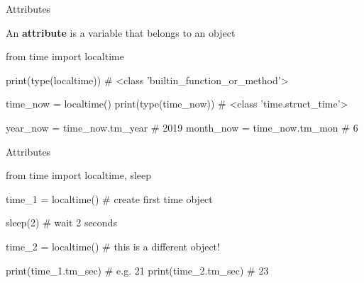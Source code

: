 \begin{frame}[fragile]{Attributes}

    \begin{block}{}
        An \textbf{attribute} is a variable that belongs to an object
    \end{block}

    \begin{pythoncode}
    from time import localtime

    print(type(localtime))
    # <class 'builtin_function_or_method'>

    time_now = localtime()
    print(type(time_now))
    # <class 'time.struct_time'>

    year_now = time_now.tm_year  # 2019
    month_now = time_now.tm_mon  # 6
    \end{pythoncode}


\end{frame}

\begin{frame}[fragile]{Attributes}

    \begin{pythoncode}
from time import localtime, sleep

time_1 = localtime()    # create first time object

sleep(2)                # wait 2 seconds

time_2 = localtime()    # this is a different object!

print(time_1.tm_sec)    # e.g. 21
print(time_2.tm_sec)    # 23
    \end{pythoncode}


\end{frame}

